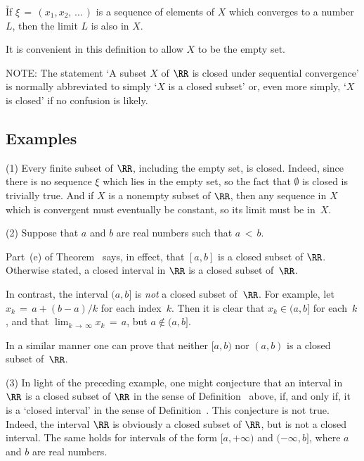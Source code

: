 \VA

        \h If ${\xi} \,=\, (x_{1},x_{2},\,{\ldots}\,)$ is a sequence of elements of $X$ which converges to a number $L$, then the limit $L$ is also in $X$.

\VA

\noindent It is convenient in this definition to allow $X$ to be the empty set.

\noindent NOTE: The statement `A subset $X$ of ${\RR}$ is closed under sequential convergence' is normally abbreviated
    to simply `$X$ is a closed subset' or, even more simply, `$X$ is closed' if no confusion is likely.

\V

            \subsection{\small{\bf Examples}}
            \label{ExampC80.20}

\V

\hspace*{\parindent}(1) Every finite subset of ${\RR}$, including the empty set, is closed.
    Indeed, since there is no sequence ${\xi}$ which lies in the empty set, so the fact that ${\emptyset}$ is closed is trivially true.
    And if $X$ is a nonempty subset of ${\RR}$, then any sequence in $X$ which is convergent must eventually be constant, so its limit must be in~$X$.

\V

        (2) Suppose that $a$ and $b$ are real numbers such that $a\,<\,b$.

        Part~(e) of Theorem~ says, in effect,
    that $[a,b]$ is a closed subset of ${\RR}$.
    Otherwise stated, a closed interval in ${\RR}$ is a closed subset of~${\RR}$.

        In contrast, the interval $(a,b]$ is {\em not} a closed subset of~${\RR}$.
    For example, let $x_{k} \,=\, a + (b-a)/k$ for each index~$k$. Then it is clear that $x_{k}{\in}(a,b]$ for each~$k$,
    and that $\lim_{k \,{\rightarrow}\, {\infty}} x_{k} \,=\, a$, but $a \not \in (a,b]$.

        In a similar manner one can prove that neither $[a,b)$ nor $(a,b)$ is a closed subset of~${\RR}$.

\V

        (3) In light of the preceding example, one might conjecture that an interval in ${\RR}$ is a closed subset of ${\RR}$ in the sense of Definition~ above,
    if, and only if, it is a `closed interval' in the sense of Definition~.
   This conjecture is not true. Indeed, the interval ${\RR}$ is obviously a closed subset of ${\RR}$, but is not a closed interval.
    The same holds for intervals of the form $[a,+{\infty})$ and $(-{\infty},b]$, where $a$ and $b$ are real numbers.

